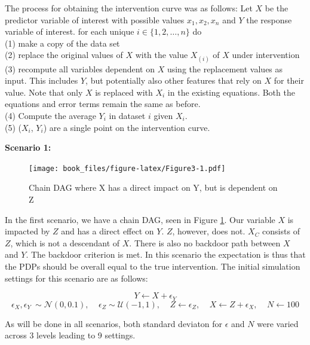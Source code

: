 \documentclass[
]{krantz}
\begin{document}
The process for obtaining the intervention curve was as follows:
Let \(X\) be the predictor variable of interest with possible values \(x_{1}, x_{2}, x_{n}\) and \(Y\) the response variable of interest.
for each unique \(i \in \{1,2,\dots,n\}\) do\\
(1) make a copy of the data set\\
(2) replace the original values of \(X\) with the value \(X_{(i)}\) of \(X\) under intervention\\
(3) recompute all variables dependent on \(X\) using the replacement values as input. This includes \(Y\), but potentially also other features that rely on \(X\) for their value. Note that only \(X\) is replaced with \(X_i\) in the existing equations. Both the equations and error terms remain the same as before.\\
(4) Compute the average \(Y_i\) in dataset \(i\) given \(X_i\).\\
(5) (\(X_i\), \(Y_i\)) are a single point on the intervention curve.

\textbf{Scenario 1: }

\begin{figure}
\centering
\texttt{[image: book\_files/figure-latex/Figure3-1.pdf]}
\caption{\label{fig:Figure3}Chain DAG where X has a direct impact on Y, but is dependent on Z}
\end{figure}

In the first scenario, we have a chain DAG, seen in Figure \ref{fig:Figure3}. Our variable \(X\) is impacted by \(Z\) and has a direct effect on \(Y\). \(Z\), however, does not. \(X_C\) consists of \(Z\), which is not a descendant of \(X\). There is also no backdoor path between \(X\) and \(Y\). The backdoor criterion is met. In this scenario the expectation is thus that the PDPs should be overall equal to the true intervention. The initial simulation settings for this scenario are as follows:

\[ Y \leftarrow X + \epsilon_Y  \]
\[ \epsilon_X,\epsilon_Y ~ \sim \mathcal{N}(0, 0.1), \ \ \ \ \ \epsilon_Z \sim \mathcal{U}(-1,1),\ \ \ \ \ Z \leftarrow \epsilon_Z, \ \ \ \ \ X \leftarrow Z + \epsilon_X, \ \ \ \ \ N \leftarrow 100 \]

As will be done in all scenarios, both standard deviaton for \(\epsilon\) and \(N\) were varied across 3 levels leading to 9 settings.
\end{document}

